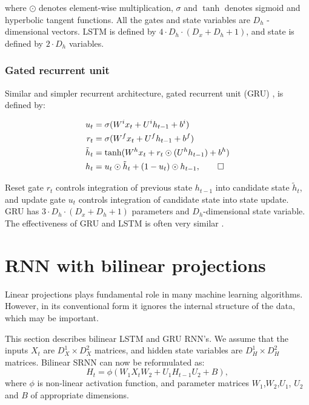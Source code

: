 \documentclass[a4paper,11pt]{article}
\begin{document}
\noindent where $\odot$ denotes element-wise multiplication,  $\sigma$ and $\tanh$ denotes sigmoid and hyperbolic tangent functions. All the gates and state variables are $D_{h}$ - dimensional vectors. LSTM is defined by $4 \cdot D_{h} \cdot (D_{x}  + D_{h} + 1)$, and state is defined by $2 \cdot D_{h}$ variables.


\subsubsection{Gated recurrent unit}

Similar and simpler recurrent architecture, gated recurrent unit (GRU) \cite{Chung}, is defined by:

\begin{align}
\begin{split}
\label{LSTM}
u_{t} &=\sigma(W^{i}x_{t} + U^{i}h_{t-1} + b^{i})\\
r_{t} &=\sigma(W^{f}x_{t} + U^{f}h_{t-1} + b^{f})\\
\tilde{h}_{t} &= \tanh(W^{h}x_{t} + r_{t} \odot (U^{h}h_{t-1}) + b^{h})\\
h_{t} &= u_{t} \odot \tilde{h}_{t} + (1 - u_{t}) \odot h_{t-1}, \qedhere
\end{split}
\end{align}

\noindent Reset gate $r_{t}$ controls integration of previous state $h_{t-1}$ into candidate state $\tilde{h}_{t}$, and update gate $u_{t}$ controls integration of candidate state into state update. GRU has $ 3 \cdot D_{h} \cdot (D_{x}  + D_{h} + 1) $ parameters and $D_{h}$-dimensional state variable. The effectiveness of GRU and LSTM is often very similar \cite{Jozefowicz}.




\section{RNN with bilinear projections}

Linear projections plays fundamental role in many machine learning algorithms. However, in its conventional form it ignores the internal structure of the data, which may be important. 

This section describes bilinear LSTM and GRU RNN's. We assume that the inputs $X_{t}$ are $D_{X}^{1} \times D_{X}^{2}$ matrices, and hidden state variables are $D_{H}^{1} \times D_{H}^{2}$ matrices. Bilinear SRNN can now be reformulated as:
\begin{equation}
\label{BSRNN}
H_{t} = \phi(W_{1}X_{t}W_{2} + U_{1}H_{t-1}U_{2} + B),
\end{equation}
\noindent where $\phi$ is non-linear activation function, and parameter matrices $W_{1}$,$W_{2}$,$U_{1}$, $U_{2}$ and $B$ of appropriate dimensions.
\end{document}
